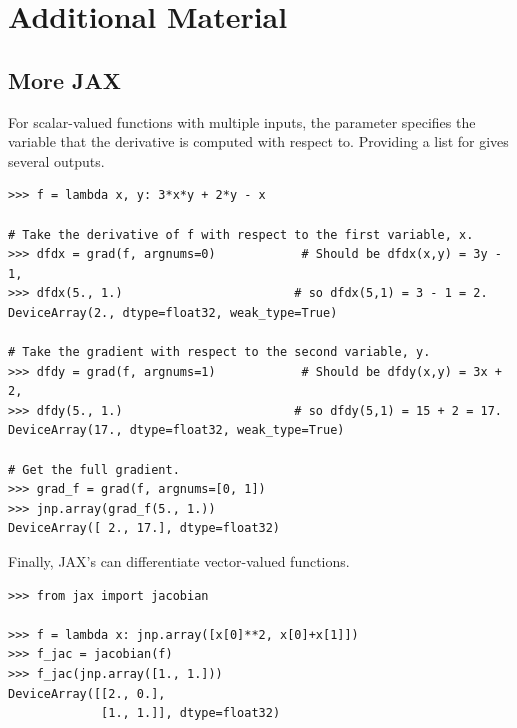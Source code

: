 \newpage

\section*{Additional Material} %

\subsection*{More JAX} %

For scalar-valued functions with multiple inputs, the parameter  specifies the variable that the derivative is computed with respect to.
Providing a list for  gives several outputs.

\begin{lstlisting}
>>> f = lambda x, y: 3*x*y + 2*y - x

# Take the derivative of f with respect to the first variable, x.
>>> dfdx = grad(f, argnums=0)            # Should be dfdx(x,y) = 3y - 1,
>>> dfdx(5., 1.)                        # so dfdx(5,1) = 3 - 1 = 2.
DeviceArray(2., dtype=float32, weak_type=True)

# Take the gradient with respect to the second variable, y.
>>> dfdy = grad(f, argnums=1)            # Should be dfdy(x,y) = 3x + 2,
>>> dfdy(5., 1.)                        # so dfdy(5,1) = 15 + 2 = 17.
DeviceArray(17., dtype=float32, weak_type=True)

# Get the full gradient.
>>> grad_f = grad(f, argnums=[0, 1])
>>> jnp.array(grad_f(5., 1.))
DeviceArray([ 2., 17.], dtype=float32)
\end{lstlisting}

Finally, JAX's  can differentiate vector-valued functions.

\begin{lstlisting}
>>> from jax import jacobian

>>> f = lambda x: jnp.array([x[0]**2, x[0]+x[1]])
>>> f_jac = jacobian(f)
>>> f_jac(jnp.array([1., 1.]))
DeviceArray([[2., 0.],
             [1., 1.]], dtype=float32)
\end{lstlisting}


